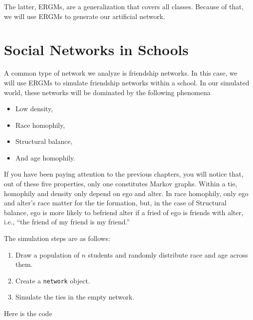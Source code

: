 \documentclass[]{book}
\providecommand{\tightlist}{%
  \setlength{\itemsep}{0pt}\setlength{\parskip}{0pt}}
\begin{document}
The latter, ERGMs, are a generalization that covers all classes. Because of that,
we will use ERGMs to generate our artificial network.

\hypertarget{social-networks-in-schools}{%
\section{Social Networks in Schools}\label{social-networks-in-schools}}

A common type of network we analyze is friendship networks. In this case,
we will use ERGMs to simulate friendship networks within a school. In our
simulated world, these networks will be dominated by the following phenomena

\begin{itemize}
\tightlist
\item
  Low density,
\item
  Race homophily,
\item
  Structural balance,
\item
  And age homophily.
\end{itemize}

If you have been paying attention to the previous chapters, you will notice that,
out of these five properties, only one constitutes Markov graphs. Within a tie,
homophily and density only depend on ego and alter. In race homophily, only ego
and alter's race matter for the tie formation, but, in the case of Structural
balance, ego is more likely to befriend alter if a fried of ego is friends with alter,
i.e., ``the friend of my friend is my friend.''

The simulation steps are as follows:

\begin{enumerate}
\def\labelenumi{\arabic{enumi}.}
\item
  Draw a population of \(n\) students and randomly distribute race and age across them.
\item
  Create a \texttt{network} object.
\item
  Simulate the ties in the empty network.
\end{enumerate}

Here is the code
\end{document}
